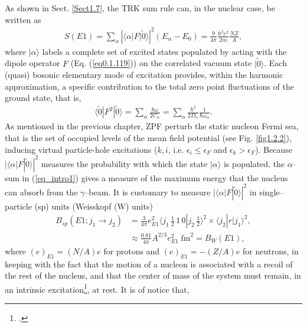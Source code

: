 As shown in Sect. \ref{Sect1.7}, the TRK sum rule can, in the nuclear case, be written as
\begin{align}\label{eq_intro1}
S(E1)=\sum_\alpha\left|\langle\alpha|F|\tilde 0\rangle\right|^2(E_\alpha-E_0)=\frac{9}{4\pi}\frac{\hbar^2e^2}{2m}\frac{NZ}{A},
\end{align}
where $|\alpha\rangle$ labels a complete set of excited  states populated by acting with the dipole operator $F$ (Eq. (\ref{eq0.1.119})) on the  correlated vacuum state $|\tilde 0\rangle$. Each (quasi) bosonic elementary mode of excitation provides, within the harmonic approximation, a specific contribution to the total zero point fluctuations of the ground state, that is,
\begin{align}\label{eqintro2}
\langle\tilde 0|F^2|\tilde 0\rangle=\sum_\alpha\frac{\hbar \omega}{2C_\alpha}=\sum_\alpha\frac{\hbar^2}{2D_\alpha}\frac{1}{\hbar\omega_\alpha}.
\end{align}
As mentioned in the previous chapter, ZPF perturb the static nucleon Fermi sea, that is the set of occupied levels of the mean field potential (see Fig. \ref{fig1.2.2}),
inducing virtual particle-hole excitations ($k,i$, i.e. $\epsilon_i\leq\epsilon_F$ and $\epsilon_k>\epsilon_F$). 
Because $|\langle \alpha|F|\tilde 0\rangle|^2$ measures the probability with which the state $|\alpha\rangle$ is populated, the $\alpha$--sum in (\ref{eq_intro1}) gives a measure of the maximum energy that the nucleus can absorb from the $\gamma$--beam. It is customary to measure  $|\langle \alpha|F|\tilde0\rangle|^2$ in single--particle (sp) units (Weisskopf (W) units)
\begin{align}\label{eq1.2.5}
\nonumber B_{sp}(E1;j_1\rightarrow j_2)&=\frac{3}{4\pi}e^2_{E1}\langle j_1\, \tfrac{1}{2}\,1\,0|j_2\,\tfrac{1}{2}\rangle^2\times \langle j_2|r|j_1\rangle^2,\\
&\approx \frac{0.81}{4\pi}A^{2/3}e^2_{E1}\;\text{fm}^2=B_W(E1),
\end{align}
where $(e)_{E1}=(N/A)e$ for protons and  $(e)_{E1}=-(Z/A)e$ for neutrons, in keeping with the fact that the motion of a nucleon is associated with a recoil of the rest of the nucleus,  and that the center of mass  of the system must remain,   in an intrinsic excitation\footnote{\cite{Bohr:69}.}, at rest. It is of notice that,




